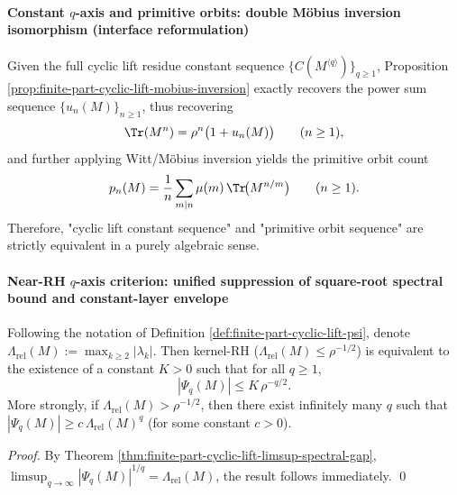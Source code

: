 \paragraph{Constant \(q\)-axis and primitive orbits: double Möbius inversion isomorphism (interface reformulation)}
\begin{corollary}\label{cor:finite-part-cyclic-constant-determines-prime-orbits}
Given the full cyclic lift residue constant sequence \(\{C(M^{\langle q\rangle})\}_{q\ge1}\), Proposition \ref{prop:finite-part-cyclic-lift-mobius-inversion} exactly recovers the power sum sequence \(\{u_n(M)\}_{n\ge1}\), thus recovering
\[
\Tr(M^n)=\rho^n\bigl(1+u_n(M)\bigr)\qquad(n\ge1),
\]
and further applying Witt/Möbius inversion yields the primitive orbit count
\[
p_n(M)=\frac{1}{n}\sum_{m\mid n}\mu(m)\,\Tr\!\bigl(M^{n/m}\bigr)\qquad(n\ge1).
\]
Therefore, "cyclic lift constant sequence" and "primitive orbit sequence" are strictly equivalent in a purely algebraic sense.
\end{corollary}

\paragraph{Near-RH \(q\)-axis criterion: unified suppression of square-root spectral bound and constant-layer envelope}
\begin{corollary}\label{cor:finite-part-near-rh-q-axis-envelope}
Following the notation of Definition \ref{def:finite-part-cyclic-lift-psi}, denote
\(
\Lambda_{\mathrm{rel}}(M):=\max_{k\ge2}|\lambda_k|.
\)
Then kernel-RH (\(\Lambda_{\mathrm{rel}}(M)\le\rho^{-1/2}\)) is equivalent to the existence of a constant \(K>0\) such that for all \(q\ge1\),
\[
|\Psi_q(M)|\le K\,\rho^{-q/2}.
\]
More strongly, if \(\Lambda_{\mathrm{rel}}(M)>\rho^{-1/2}\), then there exist infinitely many \(q\) such that
\(
|\Psi_q(M)|\ge c\,\Lambda_{\mathrm{rel}}(M)^q
\)
(for some constant \(c>0\)).
\end{corollary}
\begin{proof}
By Theorem \ref{thm:finite-part-cyclic-lift-limsup-spectral-gap},
\(
\limsup_{q\to\infty}|\Psi_q(M)|^{1/q}=\Lambda_{\mathrm{rel}}(M)
\),
the result follows immediately. \qed
\end{proof}

